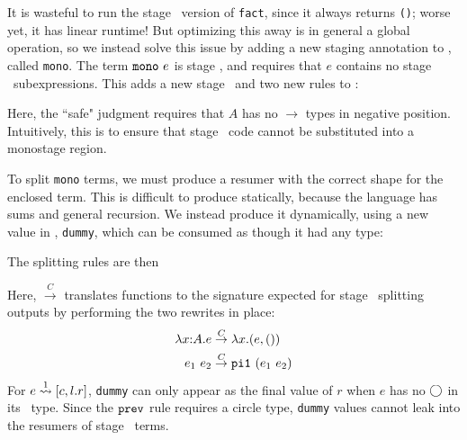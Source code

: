 It is wasteful to run the stage \bbtwo\ version of \texttt{fact}, since it
always returns \texttt{()}; worse yet, it has linear runtime!
But optimizing this away is in general a global operation,
so we instead solve this issue by adding a new staging annotation to \lang, called
\texttt{mono}. The term $\monoSt~e$ is stage \bbone, and requires that $e$ contains
no stage \bbtwo\ subexpressions. This adds a new stage \bbmono\ and two new
rules to \lang:
Here, the ``safe" judgment requires that $A$ has no $\to$ types in negative position.
Intuitively, this is to ensure that stage \bbtwo\ code cannot be substituted into a monostage region.

To split \texttt{mono} terms, we must produce a resumer with the correct shape
for the enclosed term. This is difficult to produce statically, because the
language has sums and general recursion. We instead produce it dynamically,
using a new value in \langmono, \texttt{dummy}, which can be consumed as though
it had any type:
The splitting rules are then
\begin{mathpar}
\end{mathpar}
Here, $\overset{C}{\rightarrow}$ translates functions to the signature expected for stage \bbone\ splitting outputs
by performing the two rewrites in place:
\begin{align*}
\lam x A e &\overset{C}{\rightarrow} \lambda x.(e,())\\
e_1~e_2 &\overset{C}{\rightarrow} \pio~(e_1~e_2)
\end{align*}
For $\splitone e A {c,l.r}$, \texttt{dummy} can only appear as the 
final value of $r$ when $e$ has no $\fut$ in its \lang\ type.
Since the $\prev$ rule requires a circle type, \texttt{dummy} values cannot leak 
into the resumers of stage \bbtwo\ terms.



%

